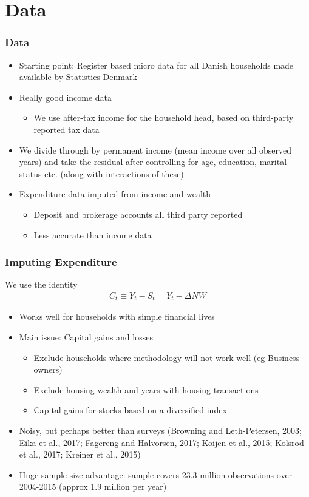 \documentclass{beamer}
\begin{document}
\section{Data}
\frame
{
	\frametitle{Data}
	\begin{itemize}
		\item Starting point: Register based micro data for all Danish households made available by Statistics Denmark
		\item Really good income data
		\begin{itemize}
			\item We use after-tax income for the household head, based on third-party reported tax data
		\end{itemize}
		\item We divide through by permanent income (mean income over all observed years) and take the residual after controlling for age, education, marital status etc. (along with interactions of these)
		\item Expenditure data imputed from income and wealth
		\begin{itemize}
			\item Deposit and brokerage accounts all third party reported
			\item Less accurate than income data
		\end{itemize}
	\end{itemize}
}
\frame
{
	\frametitle{Imputing Expenditure}
	We use the identity
		\begin{align*}
			C_t \equiv Y_t - S_t = Y_t - \Delta NW
		\end{align*}
	\begin{itemize}
		\item Works well for households with simple financial lives
		\item Main issue: Capital gains and losses
		\begin{itemize}
			\item Exclude households where methodology will not work well (eg Business owners)
			\item Exclude housing wealth and years with housing transactions
			\item Capital gains for stocks based on a diversified index
		\end{itemize}
		\item Noisy, but perhaps better than surveys (Browning and Leth-Petersen, 2003; Eika et al., 2017; Fagereng and Halvorsen, 2017; Koijen et al., 2015; Kolsrod et al., 2017; Kreiner et al., 2015)
		\item Huge sample size advantage: sample covers 23.3 million observations over 2004-2015 (approx 1.9 million per year)
	\end{itemize}
}
\end{document}
